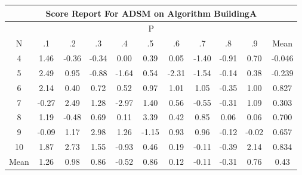 \documentclass[11pt,a4paper]{report}
\begin{document}
\begin{longtable}{ | c || c | c | c | c | c | c | c | c | c || c |}
\hline
\multicolumn{11}{|c|}{ Score Report For ADSM on Algorithm BuildingA} \\
\hline
\multicolumn{11}{|c|}{ P } \\
\hline
N & .1 & .2 & .3 & .4 & .5 & .6 & .7 & .8 & .9 & Mean\\
 \hline
 \hline
 \endhead
  4 &  \cellcolor[HTML]{D7D7FF} 1.46 &  \cellcolor[HTML]{FFF7F7} -0.36 &  \cellcolor[HTML]{FFF7F7} -0.34 &  \cellcolor[HTML]{FFFFFF} 0.00 &  \cellcolor[HTML]{F7F7FF} 0.39 &  \cellcolor[HTML]{FFFFFF} 0.05 &  \cellcolor[HTML]{FFDFDF} -1.40 &  \cellcolor[HTML]{FFE7E7} -0.91 &  \cellcolor[HTML]{EFEFFF} 0.70 & -0.046 \\
  5 &  \cellcolor[HTML]{BFBFFF} 2.49 &  \cellcolor[HTML]{E7E7FF} 0.95 &  \cellcolor[HTML]{FFE7E7} -0.88 &  \cellcolor[HTML]{FFD7D7} -1.64 &  \cellcolor[HTML]{EFEFFF} 0.54 &  \cellcolor[HTML]{FFC7C7} -2.31 &  \cellcolor[HTML]{FFD7D7} -1.54 &  \cellcolor[HTML]{FFFFFF} -0.14 &  \cellcolor[HTML]{F7F7FF} 0.38 & -0.239 \\
  6 &  \cellcolor[HTML]{C7C7FF} 2.14 &  \cellcolor[HTML]{F7F7FF} 0.40 &  \cellcolor[HTML]{EFEFFF} 0.72 &  \cellcolor[HTML]{EFEFFF} 0.52 &  \cellcolor[HTML]{E7E7FF} 0.97 &  \cellcolor[HTML]{E7E7FF} 1.01 &  \cellcolor[HTML]{E7E7FF} 1.05 &  \cellcolor[HTML]{FFF7F7} -0.35 &  \cellcolor[HTML]{E7E7FF} 1.00 & 0.827 \\
  7 &  \cellcolor[HTML]{FFF7F7} -0.27 &  \cellcolor[HTML]{BFBFFF} 2.49 &  \cellcolor[HTML]{DFDFFF} 1.28 &  \cellcolor[HTML]{FFB7B7} -2.97 &  \cellcolor[HTML]{DFDFFF} 1.40 &  \cellcolor[HTML]{EFEFFF} 0.56 &  \cellcolor[HTML]{FFEFEF} -0.55 &  \cellcolor[HTML]{FFF7F7} -0.31 &  \cellcolor[HTML]{E7E7FF} 1.09 & 0.303 \\
  8 &  \cellcolor[HTML]{DFDFFF} 1.19 &  \cellcolor[HTML]{FFEFEF} -0.48 &  \cellcolor[HTML]{EFEFFF} 0.69 &  \cellcolor[HTML]{FFFFFF} 0.11 &  \cellcolor[HTML]{A7A7FF} 3.39 &  \cellcolor[HTML]{F7F7FF} 0.42 &  \cellcolor[HTML]{E7E7FF} 0.85 &  \cellcolor[HTML]{FFFFFF} 0.06 &  \cellcolor[HTML]{FFFFFF} 0.06 & 0.700 \\
  9 &  \cellcolor[HTML]{FFFFFF} -0.09 &  \cellcolor[HTML]{DFDFFF} 1.17 &  \cellcolor[HTML]{B7B7FF} 2.98 &  \cellcolor[HTML]{DFDFFF} 1.26 &  \cellcolor[HTML]{FFDFDF} -1.15 &  \cellcolor[HTML]{E7E7FF} 0.93 &  \cellcolor[HTML]{E7E7FF} 0.96 &  \cellcolor[HTML]{FFFFFF} -0.12 &  \cellcolor[HTML]{FFFFFF} -0.02 & 0.657 \\
  10 &  \cellcolor[HTML]{CFCFFF} 1.87 &  \cellcolor[HTML]{B7B7FF} 2.73 &  \cellcolor[HTML]{D7D7FF} 1.55 &  \cellcolor[HTML]{FFE7E7} -0.93 &  \cellcolor[HTML]{F7F7FF} 0.46 &  \cellcolor[HTML]{F7F7FF} 0.19 &  \cellcolor[HTML]{FFFFFF} -0.11 &  \cellcolor[HTML]{FFF7F7} -0.39 &  \cellcolor[HTML]{C7C7FF} 2.14 & 0.834 \\
 \hline
 \hline
Mean &  \cellcolor[HTML]{DFDFFF} 1.26 &  \cellcolor[HTML]{E7E7FF} 0.98 &  \cellcolor[HTML]{E7E7FF} 0.86 &  \cellcolor[HTML]{FFEFEF} -0.52 &  \cellcolor[HTML]{E7E7FF} 0.86 &  \cellcolor[HTML]{FFFFFF} 0.12 &  \cellcolor[HTML]{FFFFFF} -0.11 &  \cellcolor[HTML]{FFF7F7} -0.31 &  \cellcolor[HTML]{EFEFFF} 0.76 &  \cellcolor[HTML]{F7F7FF} 0.43
\end{longtable}
\end{document}
